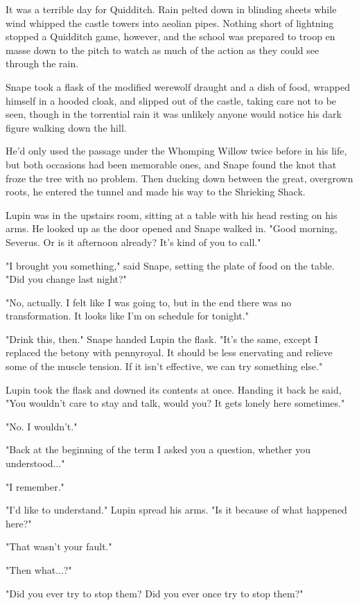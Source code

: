 \documentclass[a4paper,11pt]{article}
\begin{document}
It was a terrible day for Quidditch. Rain pelted down in blinding sheets while wind whipped the castle towers into aeolian pipes. Nothing short of lightning stopped a Quidditch game, however, and the school was prepared to troop en masse down to the pitch to watch as much of the action as they could see through the rain.

Snape took a flask of the modified werewolf draught and a dish of food, wrapped himself in a hooded cloak, and slipped out of the castle, taking care not to be seen, though in the torrential rain it was unlikely anyone would notice his dark figure walking down the hill.

He'd only used the passage under the Whomping Willow twice before in his life, but both occasions had been memorable ones, and Snape found the knot that froze the tree with no problem. Then ducking down between the great, overgrown roots, he entered the tunnel and made his way to the Shrieking Shack.

Lupin was in the upstairs room, sitting at a table with his head resting on his arms. He looked up as the door opened and Snape walked in. "Good morning, Severus. Or is it afternoon already? It's kind of you to call."

"I brought you something," said Snape, setting the plate of food on the table. "Did you change last night?"

"No, actually. I felt like I was going to, but in the end there was no transformation. It looks like I'm on schedule for tonight."

"Drink this, then." Snape handed Lupin the flask. "It's the same, except I replaced the betony with pennyroyal. It should be less enervating and relieve some of the muscle tension. If it isn't effective, we can try something else."

Lupin took the flask and downed its contents at once. Handing it back he said, "You wouldn't care to stay and talk, would you? It gets lonely here sometimes."

"No. I wouldn't."

"Back at the beginning of the term I asked you a question, whether you understood..."

"I remember."

"I'd like to understand." Lupin spread his arms. "Is it because of what happened here?"

"That wasn't your fault."

"Then what...?"

"Did you ever try to stop them? Did you ever once try to stop them?"
\end{document}
